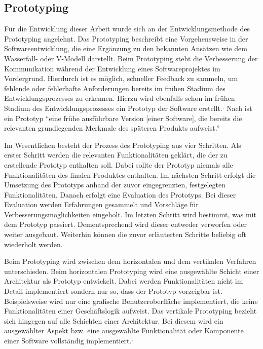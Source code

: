 \subsection{Prototyping}

Für die Entwicklung dieser Arbeit wurde sich an der Entwicklungsmethode des Prototyping angelehnt.
Das Prototyping beschreibt eine Vorgehensweise in der Softwareentwicklung, die eine Ergänzung zu den bekannten Ansätzen wie dem Wasserfall- oder V-Modell darstellt.\autocite[Vgl.][S. 14]{MS-Floyd.1984} 
Beim Prototyping steht die Verbesserung der Kommunikation während der Entwicklung eines Softwareprojektes im Vordergrund.
Hierdurch ist es möglich, schneller Feedback zu sammeln, um fehlende oder fehlerhafte Anforderungen bereits im frühen Stadium des Entwicklungsprozesses zu erkennen.
Hierzu wird ebenfalls schon im frühen Stadium des Entwicklungsprozesses ein Prototyp der Software erstellt.\autocite[Vgl.][S. 3]{MS-Floyd.1984}$^,$\autocite[Vgl.][S. 368]{MS-Alpar.2019} 
Nach \citeauthor{MS-Alpar.2019} ist ein Prototyp \enquote{eine frühe ausführbare Version [einer Software], die bereits die relevanten grundlegenden Merkmale des späteren Produkts aufweist.}\autocite[Siehe][S. 369]{MS-Alpar.2019}

Im Wesentlichen besteht der Prozess des Prototyping aus vier Schritten. 
Als erster Schritt werden die relevanten Funktionalitäten geklärt, die der zu erstellende Prototyp enthalten soll.
Dabei sollte der Prototyp niemals alle Funktionalitäten des finalen Produktes enthalten.
Im nächsten Schritt erfolgt die Umsetzung des Prototyps anhand der zuvor eingegrenzten, festgelegten Funktionalitäten.
Danach erfolgt eine Evaluation des Prototyps.
Bei dieser Evaluation werden Erfahrungen gesammelt und Vorschläge für Verbesserungsmöglichkeiten eingeholt.
Im letzten Schritt wird bestimmt, was mit dem Prototyp passiert.
Dementsprechend wird dieser entweder verworfen oder weiter ausgebaut. 
Weiterhin können die zuvor erläuterten Schritte beliebig oft wiederholt werden.\autocite[Vgl.][S. 4 f.]{MS-Floyd.1984}

Beim Prototyping wird zwischen dem horizontalen und dem vertikalen Verfahren unterschieden. 
Beim horizontalen Prototyping wird eine ausgewählte Schicht einer Architektur als Prototyp entwickelt.
Dabei werden Funktionalitäten nicht im Detail implementiert sondern nur so, dass der Prototyp vorzeigbar ist.
Beispielsweise wird nur eine grafische Benutzeroberfläche implementiert, die keine Funktionalitäten einer Geschäftslogik aufweist.
Das vertikale Prototyping bezieht sich hingegen auf alle Schichten einer Architektur. 
Bei diesem wird ein ausgewählter Aspekt bzw. eine ausgewählte Funktionalität oder Komponente einer Software vollständig implementiert.\autocite[Vgl.][Abschnitt \enquote{Arten von Prototypen}]{MS-Kuhrmann.26.09.2012}$^,$\autocite[Vgl.][S. 4]{MS-Floyd.1984} 


